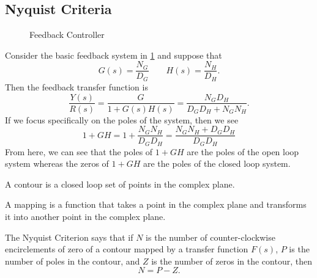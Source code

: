 \subsection{Nyquist Criteria}
\begin{figure}[H]
    \centering 
    \caption{Feedback Controller}
    \label{fig:nyquist-feedback-controller}
\end{figure}
Consider the basic feedback system in \cref{fig:nyquist-feedback-controller} and suppose that
\[
  G(s) = \frac{N_G}{D_G} \qquad H(s) = \frac{N_H}{D_H}.
\]
Then the feedback transfer function is
\[
  \frac{Y(s)}{R(s)} = \frac{G}{1+G(s)H(s)} = \frac{N_GD_H}{D_GD_H + N_GN_H}.
\]
If we focus specifically on the poles of the system, then we see
\[
  1+GH = 1 + \frac{N_GN_H}{D_GD_H} = \frac{N_GN_H+D_GD_H}{D_GD_H}
\]
From here, we can see that the poles of $1+GH$ are the poles of the open loop system whereas the zeros of $1+GH$ are the poles of the closed loop system.
\begin{definition}
  A contour is a closed loop set of points in the complex plane.
  \label{defn:contour}
\end{definition}
\begin{definition}
  A mapping is a function that takes a point in the complex plane and transforms it into another point in the complex plane.
  \label{defn:mapping}
\end{definition}
\begin{definition}
  The Nyquist Criterion says that if $N$ is the number of counter-clockwise encirclements of zero of a contour mapped by a transfer function $F(s)$, $P$ is the number of poles in the contour, and $Z$ is the number of zeros in the contour, then
  \begin{equation}
	N = P - Z.
	\label{eqn:nyquist-criteria}
  \end{equation}
  \label{defn:nyquist-criteria}
\end{definition}
